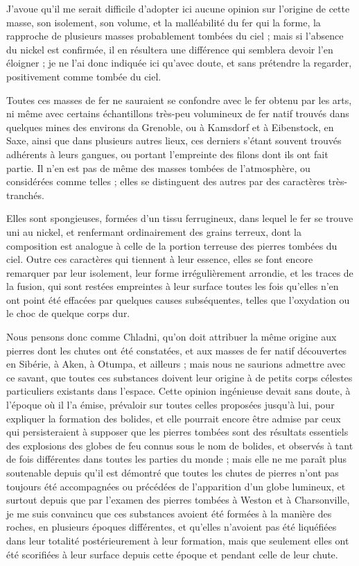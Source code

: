 \documentclass[a4paper, 12pt, oneside, french]{article}
\begin{document}
J'avoue qu'il me serait difficile d'adopter ici aucune opinion sur l'origine de cette masse, son isolement, son volume, et la malléabilité du fer qui la forme, la rapproche de plusieurs masses probablement tombées du ciel ; mais si l'absence du nickel est confirmée, il en résultera une différence qui semblera devoir l'en éloigner ; je ne l'ai donc indiquée ici qu'avec doute, et sans prétendre la regarder, positivement comme tombée du ciel.

Toutes ces masses de fer ne sauraient se confondre avec le fer obtenu par les arts, ni même avec certains échantillons très-peu volumineux de fer natif trouvés dans quelques mines des environs da Grenoble, ou à Kamsdorf et à Eibenstock, en Saxe, ainsi que dans plusieurs autres lieux, ces derniers s'étant souvent trouvés adhérents à leurs gangues, ou portant l'empreinte des filons dont ils ont fait partie. Il n'en est pas de même des masses tombées de l'atmosphère, ou considérées comme telles ; elles se distinguent des autres par des caractères très-tranchés.

Elles sont spongieuses, formées d'un tissu ferrugineux, dans lequel le fer se trouve uni au nickel, et renfermant ordinairement des grains terreux, dont la composition est analogue à celle de la portion terreuse des pierres tombées du ciel. Outre ces caractères qui tiennent à leur essence, elles se font encore remarquer par leur isolement, leur forme irrégulièrement arrondie, et les traces de la fusion, qui sont restées empreintes à leur surface toutes les fois qu'elles n'en ont point été effacées par quelques causes subséquentes, telles que l'oxydation ou le choc de quelque corps dur.

Nous pensons donc comme Chladni, qu'on doit attribuer la même origine aux pierres dont les chutes ont été constatées, et aux masses de fer natif découvertes en Sibérie, à Aken, à Otumpa, et ailleurs ; mais nous ne saurions admettre avec ce savant, que toutes ces substances doivent leur origine à de petits corps célestes particuliers existants dans l'espace. Cette opinion ingénieuse devait sans doute, à l'époque où il l'a émise, prévaloir sur toutes celles proposées jusqu'à lui, pour expliquer la formation des bolides, et elle pourrait encore être admise par ceux qui persisteraient à supposer que les pierres tombées sont des résultats essentiels des explosions des globes de feu connus sous le nom de bolides, et observés à tant de fois différentes dans toutes les parties du monde ; mais elle ne me paraît plus soutenable depuis qu'il est démontré que toutes les chutes de pierres n'ont pas toujours été accompagnées ou précédées de l'apparition d'un globe lumineux, et surtout depuis que par l'examen des pierres tombées à Weston et à Charsonville, je me suis convaincu que ces substances avoient été formées à la manière des roches, en plusieurs époques différentes, et qu'elles n'avoient pas été liquéfiées dans leur totalité postérieurement à leur formation, mais que seulement elles ont été scorifiées à leur surface depuis cette époque et pendant celle de leur chute.
\end{document}
